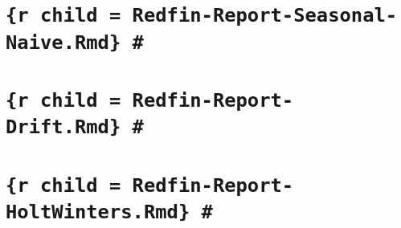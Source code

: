 \documentclass[]{article}
\begin{document}
\section{\texorpdfstring{\texttt{\{r\ child\ =\ \textquotesingle{}Redfin-Report-Seasonal-Naive.Rmd\textquotesingle{}\}\ \#}}{\{r child = 'Redfin-Report-Seasonal-Naive.Rmd'\} \#}}\label{r-child-redfin-report-seasonal-naive.rmd}

\section{\texorpdfstring{\texttt{\{r\ child\ =\ \textquotesingle{}Redfin-Report-Drift.Rmd\textquotesingle{}\}\ \#}}{\{r child = 'Redfin-Report-Drift.Rmd'\} \#}}\label{r-child-redfin-report-drift.rmd}

\section{\texorpdfstring{\texttt{\{r\ child\ =\ \textquotesingle{}Redfin-Report-HoltWinters.Rmd\textquotesingle{}\}\ \#}}{\{r child = 'Redfin-Report-HoltWinters.Rmd'\} \#}}\label{r-child-redfin-report-holtwinters.rmd}
\end{document}
